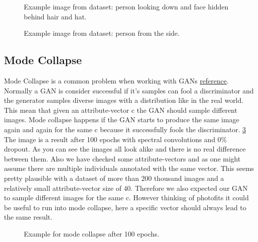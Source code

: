 \documentclass[12pt, a4paper]{article}
\begin{document}
\begin{figure}
    \caption{Example image from dataset: person looking down and face hidden behind hair and hat.}
    \label{fig:wrongDirectionImage}
\end{figure}
\begin{figure}
    \caption{Example image from dataset: person from the side.}
    \label{fig:wrongDirectionImage2}
\end{figure}

\subsection{Mode Collapse}
Mode Collapse is a common problem when working with GANs \href{https://machinelearning.wtf/terms/mode-collapse/}{reference}. 
Normally a GAN is consider successful if it's samples can fool a discriminator and the generator samples diverse images with a distribution like in the real world. 
This mean that given an attribute-vector c the GAN should sample different images. Mode collapse happens if the GAN starts to produce the same image again and again for the same c 
because it successfully fools the discriminator. \ref{fig:modecollapse}
The image is a result after 100 epochs with spectral convolutions and 0\% dropout. As you can see the images all look alike and there is no real difference between them. Also we have checked some attribute-vectors and as one might assume there are multiple individuals annotated with the same vector. This seems pretty plausible with a dataset of more than 200 thousand images and a relatively small attribute-vector size of 40. Therefore we also expected our GAN to sample different images for the same c. However thinking of photofits it could be useful to run into mode collapse, here a specific vector should always lead to the same result.
\begin{figure}
    \caption{Example for mode collapse after 100 epochs.}
    \label{fig:modecollapse}
\end{figure}
\end{document}
